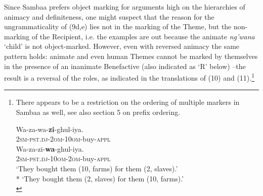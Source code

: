 \documentclass[output=paper
,modfonts
,nonflat]{langsci/langscibook}
\begin{document}
\settowidth{}
Since Sambaa prefers object marking for arguments high on the hierarchies of animacy and definiteness, one might suspect that the reason for the ungrammaticality of (9d,e) lies not in the marking of the Theme, but the non-marking of the Recipient, i.e. the examples are out because the animate \textit{ng’wana} ‘child’ is not object-marked. However, even with reversed animacy the same pattern holds: animate and even human Themes cannot be marked by themselves in the presence of an inanimate Benefactive (also indicated as ‘R’ below) –the result is a reversal of the roles, as indicated in the translations of (10) and (11).\footnote{There appears to be a restriction on the ordering of multiple markers in Sambaa as well, see also section 5 on prefix ordering.

\ea \settowidth{}
		\gll *Wa-za-wa-\textbf{zi}-ghul-iya.\\
		\textsc{2sm-pst.dj-2om-10om}-buy-\textsc{appl}	\\
	\z 
\ea
		\gll Wa-za-zi{}-\textbf{wa}-ghul-iya.\\
		\textsc{2sm-pst.dj-10om-2om}-buy-\textsc{appl}\\
		\glt `They bought them (10, farms) for them (2, slaves).'\\
		* `They bought them (2, slaves) for them (10, farms).'\\
	\z
\z} %
\end{document}

